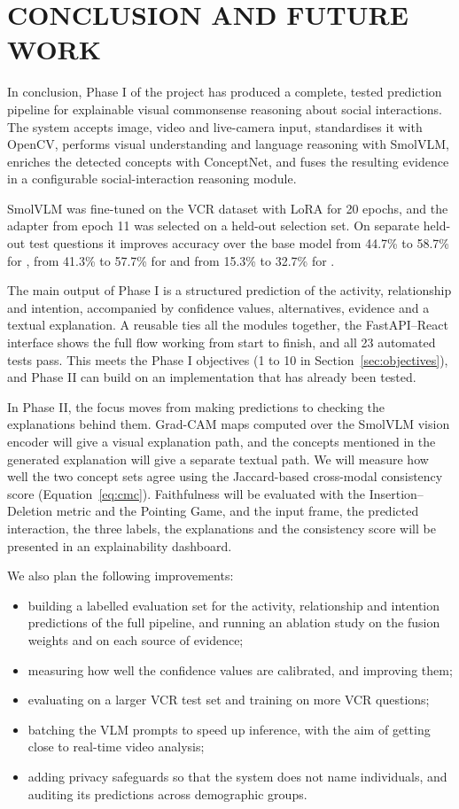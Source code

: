 \chapter{CONCLUSION AND FUTURE WORK}
\label{ch:conclusion}

In conclusion, Phase I of the project has produced a complete, tested prediction pipeline for explainable visual commonsense reasoning about social interactions. The system accepts image, video and live-camera input, standardises it with OpenCV, performs visual understanding and language reasoning with SmolVLM, enriches the detected concepts with ConceptNet, and fuses the resulting evidence in a configurable social-interaction reasoning module.

SmolVLM was fine-tuned on the VCR dataset with LoRA for 20 epochs, and the adapter from epoch 11 was selected on a held-out selection set. On separate held-out test questions it improves accuracy over the base model from 44.7\% to 58.7\% for \QtoA, from 41.3\% to 57.7\% for \QAtoR{} and from 15.3\% to 32.7\% for \QtoAR.

The main output of Phase I is a structured prediction of the activity, relationship and intention, accompanied by confidence values, alternatives, evidence and a textual explanation. A reusable  ties all the modules together, the FastAPI--React interface shows the full flow working from start to finish, and all 23 automated tests pass. This meets the Phase I objectives (1 to 10 in Section~\ref{sec:objectives}), and Phase II can build on an implementation that has already been tested.

In Phase II, the focus moves from making predictions to checking the explanations behind them. Grad-CAM maps computed over the SmolVLM vision encoder will give a visual explanation path, and the concepts mentioned in the generated explanation will give a separate textual path. We will measure how well the two concept sets agree using the Jaccard-based cross-modal consistency score (Equation~\ref{eq:cmc}). Faithfulness will be evaluated with the Insertion--Deletion metric and the Pointing Game, and the input frame, the predicted interaction, the three labels, the explanations and the consistency score will be presented in an explainability dashboard.

We also plan the following improvements:
\begin{itemize}
\item building a labelled evaluation set for the activity, relationship and intention predictions of the full pipeline, and running an ablation study on the fusion weights and on each source of evidence;
\item measuring how well the confidence values are calibrated, and improving them;
\item evaluating on a larger VCR test set and training on more VCR questions;
\item batching the VLM prompts to speed up inference, with the aim of getting close to real-time video analysis;
\item adding privacy safeguards so that the system does not name individuals, and auditing its predictions across demographic groups.
\end{itemize}
